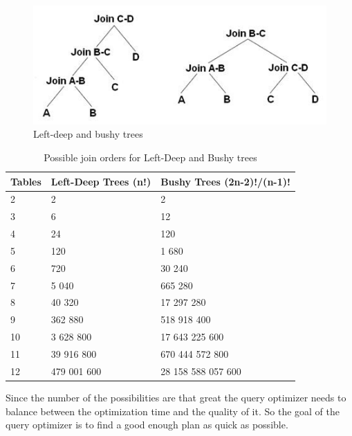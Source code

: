 \documentclass{cslthse-msc}
\begin{document}
\begin{figure}[H] 
\begin{center}
    \includegraphics[scale=0.7]{Pictures/trees.jpg}
  \end{center}
  \caption{Left-deep and bushy trees}
  \label{fig:trees}
\end{figure} 
\begin{table}[H]
\centering 
\begin{tabular}{ l l l }
  Tables & Left-Deep Trees (n!) & Bushy Trees (2n-2)!/(n-1)! \\\hline
  2 & 2 & 2 \\\hline
  3 & 6 & 12 \\\hline
  4 & 24 & 120 \\\hline
  5 & 120 & 1 680 \\\hline
  6 & 720 & 30 240 \\\hline
  7 & 5 040 & 665 280 \\\hline
  8 & 40 320 & 17 297 280 \\\hline
  9 & 362 880 & 518 918 400 \\\hline
  10 & 3 628 800 & 17 643 225 600 \\\hline
  11 & 39 916 800 & 670 444 572 800 \\\hline
  12 & 479 001 600 & 28 158 588 057 600 \\
\end{tabular}
\caption {Possible join orders for Left-Deep and Bushy trees}
\label{table:join}
\end{table}

\noindent Since the number of the possibilities are that great the query optimizer needs to balance between the optimization time and the quality of it. So the goal of the query optimizer is to find a good enough plan as quick as possible. 
\end{document}
